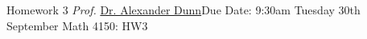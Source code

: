     




\newpage{}
{Homework 3}
{\textit{Prof.} \href{https://alexjdunn.weebly.com/}{Dr. Alexander Dunn}}{Due Date: 9:30am Tuesday 30th September}
{Math 4150: HW3}


\newpage


